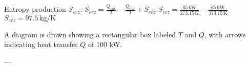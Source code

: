 Entropy production \( S_{erz} \):  
\( S_{erz} = \frac{Q_{out}}{T} - \frac{Q_{out}}{T} + S_{erz} \)  
\( S_{erz} = \frac{65 \, \text{kW}}{273.15 \, \text{K}} - \frac{65 \, \text{kW}}{373.15 \, \text{K}} \)  
\( S_{erz} = 97.5 \, \text{kg/K} \)  

A diagram is drawn showing a rectangular box labeled \( T \) and \( Q \), with arrows indicating heat transfer \( Q \) of 100 kW.  

---
